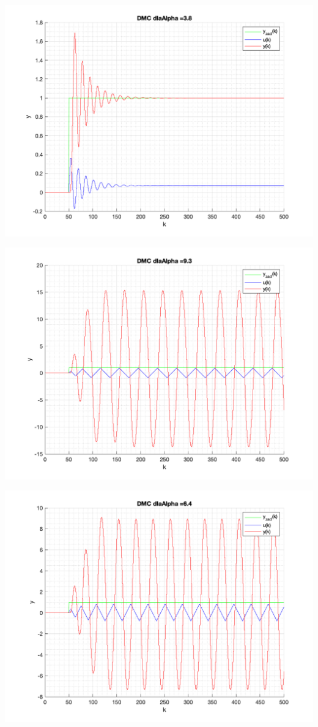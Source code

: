 \documentclass[a4paper, 11pt]{article}
\begin{document}
\begin{enumerate}
 \includegraphics[width=\linewidth]{./ModelsDodatkowe_Alpha/P4_DMC_Alpha_3_8_png.png} 
 
 \includegraphics[width=\linewidth]{./ModelsDodatkowe_Alpha/P4_DMC_Alpha_9_3_png.png} 
 
 \includegraphics[width=\linewidth]{./ModelsDodatkowe_Alpha/P4_DMC_Alpha_6_4_png.png} 
 

\end{enumerate}
\end{document}
